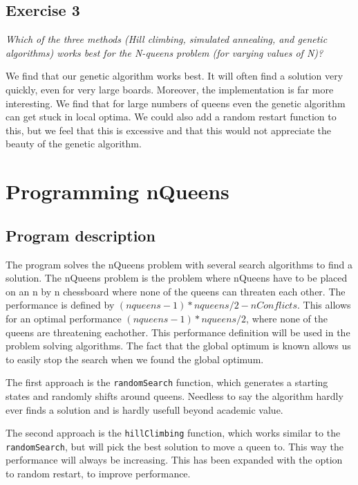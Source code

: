 \documentclass{article}
\begin{document}
\subsection*{Exercise 3}


\textit{Which of the three methods (Hill climbing, simulated annealing, and genetic algorithms) works best for the N-queens problem (for varying values of N)?}

We find that our genetic algorithm works best. It will often find a solution very quickly, even for very large boards. Moreover, the implementation is far more interesting. We find that for large numbers of queens even the genetic algorithm can get stuck in local optima. We could also add a random restart function to this, but we feel that this is excessive and that this would not appreciate the beauty of the genetic algorithm.


\section*{Programming nQueens} 
\subsection*{Program description}
The program solves the nQueens problem with several search algorithms to find a solution. The nQueens problem is the problem where nQueens have to be placed on an n by n chessboard where none of the queens can threaten each other.
The performance is defined by $ (nqueens-1)*nqueens/2 -nConflicts$. This allows for an optimal performance $(nqueens-1)*nqueens/2$, where none of the queens are threatening eachother. This performance definition will be used in the problem solving algorithms. The fact that the global optimum is known allows us to easily stop the search when we found the global optimum. 

The first approach is the \verb!randomSearch! function, which generates a starting states and randomly shifts around queens. Needless to say the algorithm hardly ever finds a solution and is hardly usefull beyond academic value.

The second approach is the \verb!hillClimbing! function, which works similar to the \verb!randomSearch!, but will pick the best solution to move a queen to. This way the performance will always be increasing. This has been expanded with the option to random restart, to improve performance.
\end{document}
